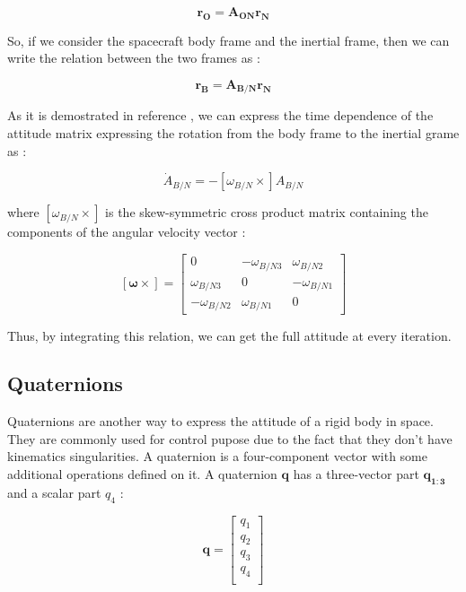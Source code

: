 \documentclass[11pt,a4paper]{report}
\begin{document}
\begin{equation}
 \mathbf{r_{O}} = \mathbf{A_{ON}} \mathbf{r_{N}}
\end{equation}

So, if we consider the spacecraft body frame and the inertial frame, then we can write the relation between the two frames as : 

\begin{equation}
 \mathbf{r_{B}} = \mathbf{A_{B/N}} \mathbf{r_{N}}
\end{equation}

As it is demostrated in reference \cite{Ref:Books:Fundamentals}, we can express the time dependence of the attitude matrix expressing the rotation from the body frame to the inertial grame as : 

\begin{equation}
 \dot{A}_{B/N}= - [\omega_{B/N} \times]A_{B/N} 
\end{equation}

where $[\omega_{B/N} \times]$ is the skew-symmetric cross product matrix containing the components of the angular velocity vector : 

\begin{equation*}
 \mathbf{[\omega \times]} =
                                \begin{bmatrix}
                                    0 & -\omega_{B/N 3} & \omega_{B/N 2} \\
                                    \omega_{B/N 3} & 0 & -\omega_{B/N 1} \\
                                    -\omega_{B/N 2} & \omega_{B/N 1} & 0
                                \end{bmatrix}
\end{equation*}

Thus, by integrating this relation, we can get the full attitude at every iteration.

\subsection{Quaternions}
Quaternions are another way to express the attitude of a rigid body in space. They are commonly used for control pupose due to the fact that they don't have kinematics singularities.
A quaternion is a four-component vector with some additional operations defined on it. A quaternion $\mathbf{q}$ has a three-vector part $\mathbf{q_{1:3}}$ and a scalar part $q_{4}$ : 

\begin{equation*}
 \mathbf{q} =
                                \begin{bmatrix}
                                    q_{1}\\
                                    q_{2}\\
                                    q_{3}\\
                                    q_{4}\\
                                \end{bmatrix}
\end{equation*}
\end{document}

